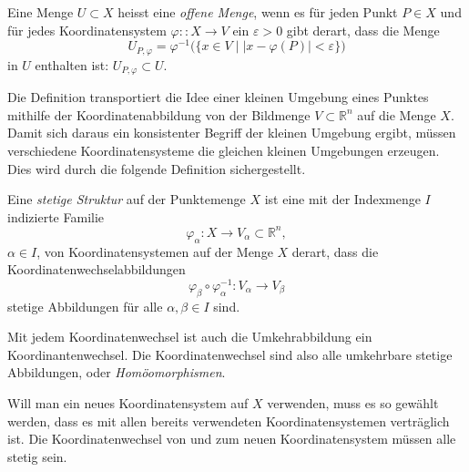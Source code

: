 \begin{definition}
\label{buch:koordinaten:koordinaten:definition:offenemenge}
Eine Menge $U\subset X$ heisst eine {\em offene Menge}, wenn es für jeden Punkt
%
%
$P\in X$ und für jedes Koordinatensystem $\varphi:\colon X\to V$
ein $\varepsilon >0$ gibt derart, dass die Menge
\[
U_{P,\varphi}
=
\varphi^{-1}\bigl(
\{
x\in V
\mid
|x-\varphi(P)|<\varepsilon
\}
\bigr)
\]
in $U$ enthalten ist: $U_{P,\varphi}\subset U$.
\end{definition}

Die Definition transportiert die Idee einer kleinen Umgebung
eines Punktes mithilfe der Koordinatenabbildung von der Bildmenge
$V\subset \mathbb{R}^n$ auf die Menge $X$.
Damit sich daraus ein konsistenter Begriff der kleinen Umgebung 
ergibt, müssen verschiedene Koordinatensysteme die gleichen
kleinen Umgebungen erzeugen.
Dies wird durch die folgende Definition sichergestellt.

\begin{definition}
\label{buch:koordinaten:koordinaten:definition:stetigestruktur}
%
%
Eine {\em stetige Struktur} auf der Punktemenge $X$ ist eine mit
der Indexmenge $I$ indizierte Familie
\[
\varphi_\alpha\colon X\to V_\alpha \subset \mathbb{R}^n,
\]
$\alpha\in I$,
von Koordinatensystemen auf der Menge $X$ derart, dass die
Koordinatenwechselabbildungen
\[
\varphi_{\beta}\circ\varphi_\alpha^{-1}
\colon
V_\alpha \to V_\beta
\]
stetige Abbildungen für alle $\alpha,\beta\in I$ sind.
\end{definition}

Mit jedem Koordinatenwechsel ist auch die Umkehrabbildung ein
Koordinantenwechsel.
Die Koordinatenwechsel sind also alle umkehrbare stetige Abbildungen,
oder {\em Homöomorphismen}.

Will man ein neues Koordinatensystem auf $X$ verwenden, muss es so
gewählt werden, dass es mit allen bereits verwendeten Koordinatensystemen
verträglich ist.
Die Koordinatenwechsel von und zum neuen Koordinatensystem müssen
alle stetig sein.

%
%

